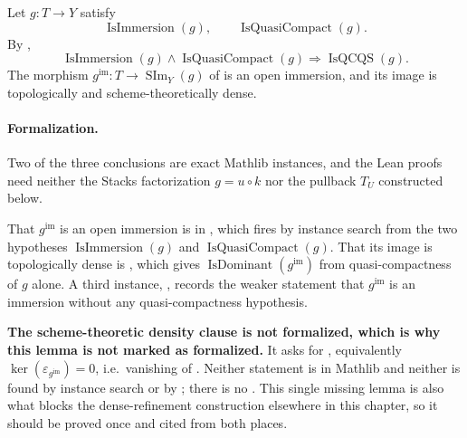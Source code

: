 \begin{lemma}
  \label{lemma:nagata-immersion-open-in-scheme-image}

  Let $g\colon T\to Y$ satisfy
  \[
    \operatorname{IsImmersion}(g),
    \qquad
    \operatorname{IsQuasiCompact}(g).
  \]
  By ,
  \[
    \operatorname{IsImmersion}(g)\wedge
      \operatorname{IsQuasiCompact}(g)
        \Longrightarrow\operatorname{IsQCQS}(g).                 \tag{IO-1}
  \]
  The morphism
  $g^{\mathrm{im}}\colon T\to\operatorname{SIm}_Y(g)$ of
   is an open immersion,
  and its image is topologically and scheme-theoretically dense.

  \paragraph{Formalization.}
  Two of the three conclusions are exact Mathlib instances, and the Lean proofs need neither
  the Stacks factorization $g=u\circ k$ nor the pullback $T_U$ constructed below.

  That $g^{\mathrm{im}}$ is an open immersion is
  \texttt{}
  in \texttt{}, which fires by
  instance search from the two hypotheses $\operatorname{IsImmersion}(g)$ and
  $\operatorname{IsQuasiCompact}(g)$.  That its image is topologically dense is
  \texttt{}, which gives
  $\operatorname{IsDominant}(g^{\mathrm{im}})$ from quasi-compactness of $g$ alone.  A third
  instance, \texttt{}, records the weaker statement that
  $g^{\mathrm{im}}$ is an immersion without any quasi-compactness hypothesis.

  \textbf{The scheme-theoretic density clause is not formalized, which is why this lemma is
  not marked as formalized.}  It asks for
  \texttt{}, equivalently
  $\ker(\varepsilon_{g^{\mathrm{im}}})=0$, i.e.\ vanishing of
  \texttt{}.  Neither statement is in Mathlib and
  neither is found by instance search or by \texttt{}; there is no
  \texttt{}.  This single missing lemma is also what
  blocks the dense-refinement construction elsewhere in this chapter, so it should be proved
  once and cited from both places.
\end{lemma}

